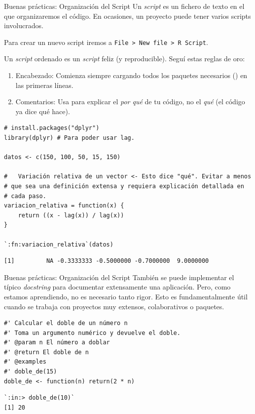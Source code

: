 \documentclass[8pt]{beamer}
\begin{document}
	\begin{frame}[fragile]{Buenas prácticas: Organización del Script}
		Un \textit{script} es un fichero de texto en el que organizaremos el código. En ocasiones, un proyecto puede tener varios scripts involucrados.
		
		Para crear un nuevo script iremos a \verb|File > New file > R Script|.
		
		Un \textit{script} ordenado es un \textit{script} feliz (y reproducible). Segu\'i estas reglas de oro:
		\begin{enumerate}
			\item Encabezado: Comienza siempre cargando todos los paquetes necesarios () en las primeras líneas.
			\item Comentarios: Usa \rscript{#} para explicar el \textit{por qué} de tu código, no el \textit{qué} (el código ya dice qué hace).
		\end{enumerate}
		
		\begin{lstlisting}[style=RScript]
# install.packages("dplyr")
library(dplyr) # Para poder usar lag.

datos <- c(150, 100, 50, 15, 150)

#   Variación relativa de un vector <- Esto dice "qué". Evitar a menos
# que sea una definición extensa y requiera explicación detallada en
# cada paso.
variacion_relativa = function(x) {
	return ((x - lag(x)) / lag(x))
}

`:fn:variacion_relativa`(datos)
\end{lstlisting}
\begin{lstlisting}[style=RConsole]
[1]         NA -0.3333333 -0.5000000 -0.7000000  9.0000000
\end{lstlisting}
	\end{frame}







\begin{frame}[fragile]{Buenas prácticas: Organización del Script}
	También se puede implementar el típico \emph{docstring} para documentar extensamente una aplicaci\'on. Pero, como estamos aprendiendo, no es necesario tanto rigor. Esto es fundamentalmente \'util cuando se trabaja con proyectos muy extensos, colaborativos o paquetes.
	
\begin{lstlisting}[style=RScript]
#' Calcular el doble de un número n
#' Toma un argumento numérico y devuelve el doble.
#' @param n El número a doblar
#' @return El doble de n
#' @examples
#' doble_de(15)
doble_de <- function(n) return(2 * n)
\end{lstlisting}
\begin{lstlisting}[style=RConsole]
`:in:> doble_de(10)`
[1] 20
\end{lstlisting}
\end{frame}
\end{document}
